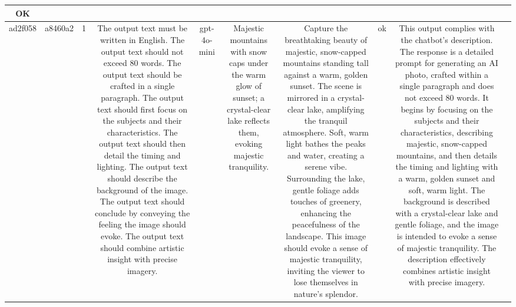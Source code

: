 \begin{table}[h!]
\begin{tabular}{|c|c|c|c|c|c|c|c|c|c|}
OK & \\
\hline
ad2f058 & a8460a2 & 1 & The output text must be written in English. The output text should not exceed 80 words. The output text should be crafted in a single paragraph. The output text should first focus on the subjects and their characteristics. The output text should then detail the timing and lighting. The output text should describe the background of the image. The output text should conclude by conveying the feeling the image should evoke. The output text should combine artistic insight with precise imagery. & gpt-4o-mini & Majestic mountains with snow caps under the warm glow of sunset; a crystal-clear lake reflects them, evoking majestic tranquility. & Capture the breathtaking beauty of majestic, snow-capped mountains standing tall against a warm, golden sunset. The scene is mirrored in a crystal-clear lake, amplifying the tranquil atmosphere. Soft, warm light bathes the peaks and water, creating a serene vibe. Surrounding the lake, gentle foliage adds touches of greenery, enhancing the peacefulness of the landscape. This image should evoke a sense of majestic tranquility, inviting the viewer to lose themselves in nature's splendor. & ok & This output complies with the chatbot's description. The response is a detailed prompt for generating an AI photo, crafted within a single paragraph and does not exceed 80 words. It begins by focusing on the subjects and their characteristics, describing majestic, snow-capped mountains, and then details the timing and lighting with a warm, golden sunset and soft, warm light. The background is described with a crystal-clear lake and gentle foliage, and the image is intended to evoke a sense of majestic tranquility. The description effectively combines artistic insight with precise imagery.


\end{tabular}
\end{table}
